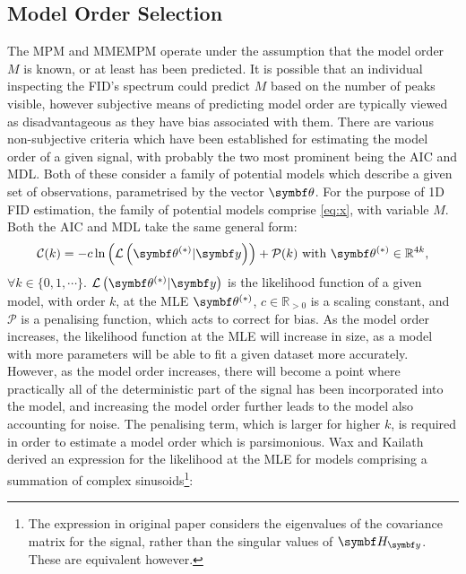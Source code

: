 \subsection{Model Order Selection}
\label{subsec:model-order}
The \ac{MPM} and \ac{MMEMPM} operate under the assumption that the model order
$M$ is known, or at least has been predicted.
It is possible that an individual inspecting the \ac{FID}'s spectrum could
predict $M$ based on the number of peaks visible, however subjective means of
predicting model order are typically viewed as disadvantageous as they have bias
associated with them.
There are various non-subjective criteria which have been established for
estimating the model order of a given signal, with probably the two most
prominent being the \ac{AIC}\cite{Akaike1974} and
\ac{MDL}\cite{Schwarz1978,Rissanen1978}. Both of these consider a family of
potential models which describe a given set of observations, parametrised by
the vector $\bth$. For the purpose of \ac{1D} \ac{FID} estimation, the family
of potential models comprise \cref{eq:x}, with variable $M$. Both the \ac{AIC}
and \ac{MDL} take the same general form:
\begin{equation}
    \mathcal{C}(k) = -c \ln \left(\mathcal{L} \left(\bthstar | \by \right)
    \right) + \mathcal{P}(k) \text{ with } \bthstar \in \mathbb{R}^{4k},
\end{equation}
$\forall k \in \lbrace 0, 1, \cdots \rbrace$. $\mathcal{L} \left(\bthstar |
\by \right)$ is the likelihood
function of a given model, with order $k$, at the \ac{MLE}
$\bthstar$, $c \in \mathbb{R}_{>0}$ is a scaling
constant, and $\mathcal{P}$ is a penalising function, which acts to correct
for bias. As the model order increases, the likelihood function at the \ac{MLE}
will increase in size, as a model with more parameters will be able to fit a
given dataset more accurately. However, as the model order increases, there will
become a point where practically all of the deterministic part of the signal
has been incorporated into the model, and increasing the model order further
leads to the model also accounting for noise. The penalising term, which
is larger for higher $k$, is required in order to estimate a model
order which is parsimonious. Wax and Kailath derived an expression for
the likelihood at the \ac{MLE} for models comprising a summation of
complex sinusoids\cite{Wax1985}\footnote{
    The expression in original paper considers the eigenvalues of the
    covariance matrix for the signal, rather than the singular values of $\Hy$.
    These are equivalent however.
}:
